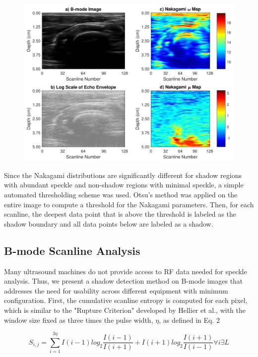\documentclass[preprint,5p]{elsarticle}
\begin{document}
\begin{figure}
	\includegraphics[scale=0.5]{fig2.pdf}
\end{figure}

Since the Nakagami distributions are significantly different for shadow regions with abundant speckle and non-shadow regions with minimal speckle, a simple automated thresholding scheme was used. Otsu's method was applied on the entire image to compute a threshold for the Nakagami parameters. Then, for each scanline, the deepest data point that is above the threshold is labeled as the shadow boundary and all data points below are labeled as a shadow.

\subsection*{B-mode Scanline Analysis}

Many ultrasound machines do not provide access to RF data needed for speckle analysis. Thus, we present a shadow detection method on B-mode images that addresses the need for usability across different equipment with minimum configuration. First, the cumulative scanline entropy is computed for each pixel, which is similar to the "Rupture Criterion" developed by Hellier et al., with the window size fixed as three times the pulse width, $\eta$, as defined in Eq. 2

\begin{equation}
S_{i,j} = \sum_{i=1}^{3\eta}I(i-1)log_{2}\frac{I(i-1)}{I(i+1)}+I(i+1)log_{2}\frac{I(i+1)}{I(i-1)}  \forall i \exists L
\end{equation}
\end{document}
